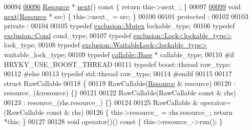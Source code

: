 \begin{DoxyCode}
00094 
\hypertarget{thread__resource_8h_source_l00096}{}\hyperlink{classhryky_1_1thread_1_1_resource_a32c89b122cd2eda508a8d1b144da8b8b}{00096}     \hyperlink{classhryky_1_1thread_1_1_resource}{Resource} * \hyperlink{classhryky_1_1thread_1_1_resource_a32c89b122cd2eda508a8d1b144da8b8b}{next}()\textcolor{keyword}{ const }\{ \textcolor{keywordflow}{return} this->next\_; \}
00097 
\hypertarget{thread__resource_8h_source_l00099}{}\hyperlink{classhryky_1_1thread_1_1_resource_a796899f9c95cb3fb66fa30e995acd293}{00099}     \textcolor{keywordtype}{void} \hyperlink{classhryky_1_1thread_1_1_resource_a796899f9c95cb3fb66fa30e995acd293}{next}(\hyperlink{classhryky_1_1thread_1_1_resource}{Resource} * src) \{ this->next\_ = src; \}
00100 
00101 \textcolor{keyword}{protected} :
00102 
00103 \textcolor{keyword}{private} :
00104 
00105     \textcolor{keyword}{typedef} \hyperlink{classhryky_1_1exclusion_1_1_mutex}{exclusion::Mutex}                        lockable\_type;
00106     \textcolor{keyword}{typedef} \hyperlink{classhryky_1_1exclusion_1_1_cond}{exclusion::Cond}                         cond\_type;
00107     \textcolor{keyword}{typedef} \hyperlink{classhryky_1_1exclusion_1_1_lock}{exclusion::Lock<lockable_type>}          lock\_type;
00108     \textcolor{keyword}{typedef} \hyperlink{classhryky_1_1exclusion_1_1_waitable_lock}{exclusion::WaitableLock<lockable_type>}  waitable\_lock\_type;
00109     \textcolor{keyword}{typedef} \hyperlink{classhryky_1_1thread_1_1callable_1_1_base}{callable::Base} *                        callable\_type;  
00110 \textcolor{preprocessor}{#if HRYKY\_USE\_BOOST\_THREAD}
00111 \textcolor{preprocessor}{}    \textcolor{keyword}{typedef} boost::thread                           raw\_type;    
00112 \textcolor{preprocessor}{#else}
00113 \textcolor{preprocessor}{}    \textcolor{keyword}{typedef} std::thread                             raw\_type;    
00114 \textcolor{preprocessor}{#endif}
00115 \textcolor{preprocessor}{}
00117     \textcolor{keyword}{struct }RawCallable
00118     \{
00119         RawCallable(\hyperlink{classhryky_1_1thread_1_1_resource}{Resource} & resource)
00120             : resource\_(&resource) \{\}
00121 
00122         RawCallable(RawCallable \textcolor{keyword}{const} & rhs)
00123             : resource\_(rhs.resource\_) \{\}
00124 
00125         RawCallable & operator=(RawCallable \textcolor{keyword}{const} & rhs)
00126         \{ this->resource\_ = rhs.resource\_; \textcolor{keywordflow}{return} *\textcolor{keyword}{this}; \}
00127 
00128         \textcolor{keywordtype}{void} operator()()\textcolor{keyword}{ const }\{ this->resource\_->run(); \}

\end{DoxyCode}
